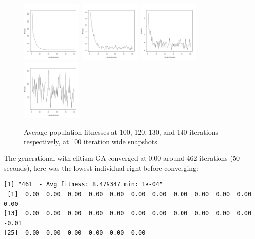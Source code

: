 \documentclass[12pt]{article}
\begin{document}
\begin{figure}[!h]
        \begin{center}
		\includegraphics[width=30mm]{images/gen_elite/avg_101.pdf}
		\includegraphics[width=30mm]{images/gen_elite/avg_120.pdf}
		\includegraphics[width=30mm]{images/gen_elite/avg_130.pdf}
		\includegraphics[width=30mm]{images/gen_elite/avg_140.pdf}
               	\caption{Average population fitnesses at 100, 120, 130, and 140 iterations, respectively, at 100 iteration wide snapshots}
                \label{ss_avg_pop_fit}
        \end{center}
\end{figure}

The generational with elitism GA converged at 0.00 around 462 iterations (50 seconds), here was the lowest individual right before converging:
\scriptsize
\begin{lstlisting}
[1] "461  - Avg fitness: 8.479347 min: 1e-04"
 [1]  0.00  0.00  0.00  0.00  0.00  0.00  0.00  0.00  0.00  0.00  0.00  0.00
[13]  0.00  0.00  0.00  0.00  0.00  0.00  0.00  0.00  0.00  0.00  0.00 -0.01
[25]  0.00  0.00  0.00  0.00  0.00  0.00
\end{lstlisting}
\normalsize
\end{document}

